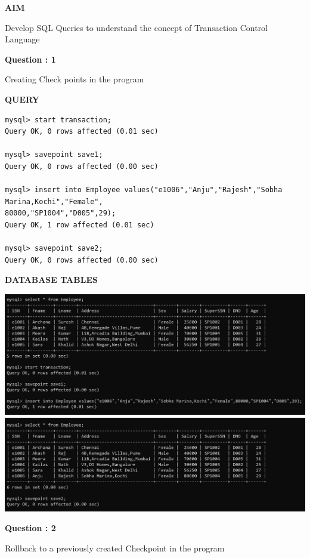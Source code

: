 \documentclass[a4paper,12pt]{report}
\begin{document}
\begin{flushleft}
\textbf{AIM }
\end{flushleft}
Develop SQL Queries to understand the concept of Transaction Control Language

\begin{flushleft}
    \textbf{Question : 1}
\end{flushleft}
Creating Check points in the program

\begin{flushleft}
\textbf{QUERY }
\end{flushleft}
 \begin{verbatim}
mysql> start transaction;
Query OK, 0 rows affected (0.01 sec)

mysql> savepoint save1;
Query OK, 0 rows affected (0.00 sec)

mysql> insert into Employee values("e1006","Anju","Rajesh","Sobha Marina,Kochi","Female",
80000,"SP1004","D005",29);
Query OK, 1 row affected (0.01 sec)

mysql> savepoint save2;
Query OK, 0 rows affected (0.00 sec)
\end{verbatim}
\begin{flushleft}
\textbf{DATABASE TABLES}
\end{flushleft}
\includegraphics[scale=0.35]{tcl1.png}
\includegraphics[scale=0.35]{tcl2.png}

\begin{flushleft}
    \textbf{Question : 2}
\end{flushleft}
Rollback to a previously created Checkpoint in the program
\end{document}

